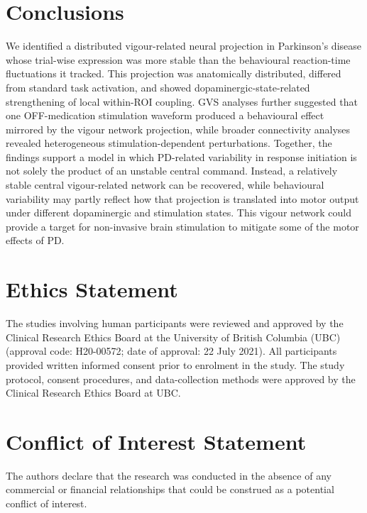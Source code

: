 \documentclass[utf8]{FrontiersinHarvard}
\begin{document}
\section{Conclusions}
We identified a distributed vigour-related neural projection in Parkinson's disease whose trial-wise expression was more stable than the behavioural reaction-time fluctuations it tracked. This projection was anatomically distributed, differed from standard task activation, and showed dopaminergic-state-related strengthening of local within-ROI coupling. GVS analyses further suggested that one OFF-medication stimulation waveform produced a behavioural effect mirrored by the vigour network projection, while broader connectivity analyses revealed heterogeneous stimulation-dependent perturbations. Together, the findings support a model in which PD-related variability in response initiation is not solely the product of an unstable central command. Instead, a relatively stable central vigour-related network can be recovered, while behavioural variability may partly reflect how that projection is translated into motor output under different dopaminergic and stimulation states. This vigour network could provide a target for non-invasive brain stimulation to mitigate some of the motor effects of PD.

\section*{Ethics Statement}
The studies involving human participants were reviewed and approved by the Clinical Research Ethics Board at the University of British Columbia (UBC) (approval code: H20-00572; date of approval: 22 July 2021). All participants provided written informed consent prior to enrolment in the study. The study protocol, consent procedures, and data-collection methods were approved by the Clinical Research Ethics Board at UBC.

\section*{Conflict of Interest Statement}
The authors declare that the research was conducted in the absence of any commercial or financial relationships that could be construed as a potential conflict of interest.
\end{document}
